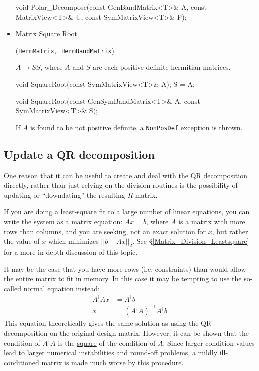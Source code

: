 \documentclass[twoside,letterpaper,11pt]{article}
\renewcommand{\tt}[1]{{\lstinline {#1}}}
\begin{document}
\begin{itemize}
\begin{tmvcode}
void Polar_Decompose(const GenBandMatrix<T>& A,
      const MatrixView<T>& U, const SymMatrixView<T>& P);
\end{tmvcode}

\item Matrix Square Root 

(\tt{HermMatrix, HermBandMatrix})

$A \rightarrow S S$, where $A$ and $S$ are each positive definite hermitian matrices.

\begin{tmvcode}
void SquareRoot(const SymMatrixView<T>& A);
S = A;

void SquareRoot(const GenSymBandMatrix<T>& A, 
      const SymMatrixView<T>& S);
\end{tmvcode}

If $A$ is found to be not positive definite, a \tt{NonPosDef} exception is thrown.

\end{itemize}

\subsection{Update a QR decomposition}
\label{QRUpdate}

One reason that it can be useful to create and deal with the QR decomposition directly,
rather than 
just relying on the division routines is the possibility
of updating or ``downdating'' the resulting $R$ matrix.  

If you are doing a 
least-square fit to a large number of linear equations, you can write the system as
a matrix equation: 
$A x = b$, where $A$ is a matrix with more rows than columns, and you are seeking,
not an exact solution for $x$, but rather the value of $x$ which minimizes
$||b-Ax||_2$.  See \S\ref{Matrix_Division_Leastsquare} for a more in depth discussion of this topic.

It may be the case that you
have more rows (i.e. constraints) than would allow the entire matrix to fit in memory.  
In this case it may be tempting to use the so-called normal equation instead: 
\begin{align*}
A^\dagger A x &= A^\dagger b \\
x & = (A^\dagger A)^{-1} A^\dagger b
\end{align*}
This equation theoretically gives the same 
solution as using the QR decomposition on the original design matrix.
However, it can be shown that the condition of $A^\dagger A$ is the 
\underline{square} of the condition of $A$.  Since larger condition values
lead to larger numerical instabilities and round-off problems, a mildly
ill-conditioned matrix is made much worse by this procedure.
\end{document}
